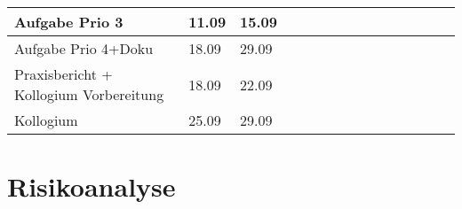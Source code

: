 \begin{landscape}
\begin{tabularx}{21cm}{|l|l|l|X|X|X|X|X|X|X|X|X|X|X|X|}
        Aufgabe Prio 3                         & 11.09           & 15.09         &                          &                          &                          &                          &                          &                          &                          &                          &                          & \cellcolor[HTML]{34CDF9} &                          &                          \\ \hline
        Aufgabe Prio 4+Doku                    & 18.09           & 29.09         &                          &                          &                          &                          &                          &                          &                          &                          &                          & \cellcolor[HTML]{68CBD0} & \cellcolor[HTML]{68CBD0} & \cellcolor[HTML]{68CBD0} \\ \hline
        Praxisbericht + Kollogium Vorbereitung & 18.09           & 22.09         &                          &                          &                          &                          &                          &                          &                          &                          &                          &                          & \cellcolor[HTML]{34FF34} &                          \\ \hline
        Kollogium                              & 25.09           & 29.09         &                          &                          &                          &                          &                          &                          &                          &                          &                          &                          &                          & \cellcolor[HTML]{FE0000} \\ \hline
    \end{tabularx}
    \end{landscape}
       



\section{Risikoanalyse}

